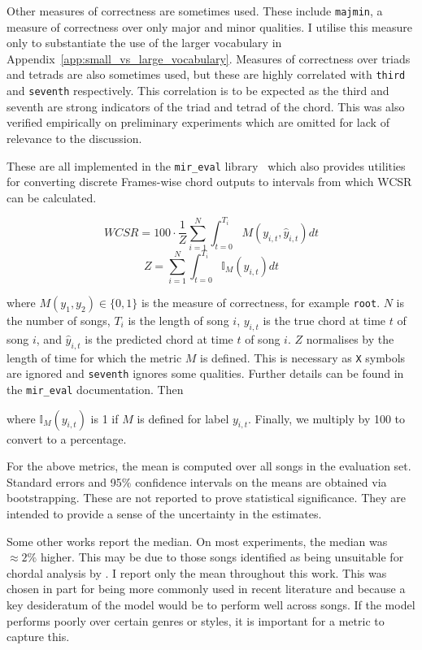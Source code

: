 Other measures of correctness are sometimes used. These include \texttt{majmin}, a measure of correctness over only major and minor qualities. I utilise this measure only to substantiate the use of the larger vocabulary in Appendix~\ref{app:small_vs_large_vocabulary}. Measures of correctness over triads and tetrads are also sometimes used, but these are highly correlated with \texttt{third} and \texttt{seventh} respectively. This correlation is to be expected as the third and seventh are strong indicators of the triad and tetrad of the chord. This was also verified empirically on preliminary experiments which are omitted for lack of relevance to the discussion.

These are all implemented in the \texttt{mir\_eval} library~\citep{mir_eval} which also provides utilities for converting discrete Frames-wise chord outputs to intervals from which WCSR can be calculated.

\begin{equation}\label{eq:wcsr}
    WCSR = 100\cdot\frac{1}{Z}\sum_{i=1}^{N} \int_{t=0}^{T_i} M(y_{i,t},\hat{y}_{i,t}) dt
\end{equation}
\begin{equation}
    Z = \sum_{i=1}^{N} \int_{t=0}^{T_i} \mathbb{I}_M(y_{i,t}) dt
\end{equation}

where $M(y_1, y_2)\in\{0,1\}$ is the measure of correctness, for example \texttt{root}. $N$ is the number of songs, $T_i$ is the length of song $i$, $y_{i,t}$ is the true chord at time $t$ of song $i$, and $\hat{y}_{i,t}$ is the predicted chord at time $t$ of song $i$. $Z$ normalises by the length of time for which the metric $M$ is defined. This is necessary as \texttt{X} symbols are ignored and \texttt{seventh} ignores some qualities. Further details can be found in the \texttt{mir\_eval} documentation. Then

where $\mathbb{I}_M(y_{i,t})$ is 1 if $M$ is defined for label $y_{i,t}$. Finally, we multiply by 100 to convert to a percentage.

For the above metrics, the mean is computed over all songs in the evaluation set. Standard errors and 95\% confidence intervals on the means are obtained via bootstrapping. These are not reported to prove statistical significance. They are intended to provide a sense of the uncertainty in the estimates.

Some other works report the median. On most experiments, the median was $\approx 2\%$ higher. This may be due to those songs identified as being unsuitable for chordal analysis by \citet{FourTimelyInsights}. I report only the mean throughout this work. This was chosen in part for being more commonly used in recent literature and because a key desideratum of the model would be to perform well across songs. If the model performs poorly over certain genres or styles, it is important for a metric to capture this.

